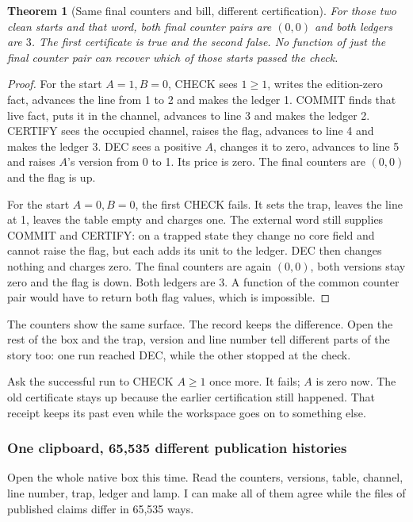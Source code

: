 \documentclass[11pt,twoside]{article}
\theoremstyle{thielethm}
\newtheorem{theorem}{Theorem}[section]
\theoremstyle{thieledef}
\theoremstyle{thieledef}
\theoremstyle{thieledef}
\theoremstyle{thielethm}
\theoremstyle{thieleobs}
\theoremstyle{thielethm}
\begin{document}
\begin{theorem}[Same final counters and bill, different certification]\label{thm:native-erasure-pair}
For those two clean starts and that word, both final counter pairs are $(0,0)$ and both
ledgers are $3$. The first certificate is true and the second false. No function of
just the final counter pair can recover which of those starts passed the check.
\end{theorem}
\begin{proof}
For the start $A=1,B=0$, CHECK sees $1\ge1$, writes the edition-zero fact, advances
the line from 1 to 2 and makes the ledger 1. COMMIT finds that live fact, puts it in the
channel, advances to line 3 and makes the ledger 2. CERTIFY sees the occupied channel,
raises the flag, advances to line 4 and makes the ledger 3. DEC sees a positive $A$,
changes it to zero, advances to line 5 and raises $A$'s version from 0 to 1. Its price
is zero. The final counters are $(0,0)$ and the flag is up.

For the start $A=0,B=0$, the first CHECK fails. It sets the trap, leaves the line at 1,
leaves the table empty and charges one. The external word still supplies COMMIT and
CERTIFY: on a trapped state they change no core field and cannot raise the flag, but
each adds its unit to the ledger. DEC then changes nothing and charges zero. The final
counters are again $(0,0)$, both versions stay zero and the flag is down. Both ledgers
are 3. A function of the common counter pair would have to return both flag values,
which is impossible.
\end{proof}

The counters show the same surface. The record keeps the difference. Open the rest of
the box and the trap, version and line number tell different parts of the story too:
one run reached DEC, while the other stopped at the check.

Ask the successful run to CHECK $A\ge1$ once more. It fails; $A$ is zero now. The old
certificate stays up because the earlier certification still happened. That receipt
keeps its past even while the workspace goes on to something else.

\subsubsection*{One clipboard, 65,535 different publication histories}

Open the whole native box this time. Read the counters, versions, table, channel,
line number, trap, ledger and lamp. I can make all of them agree while the files of
published claims differ in 65,535 ways.
\end{document}
